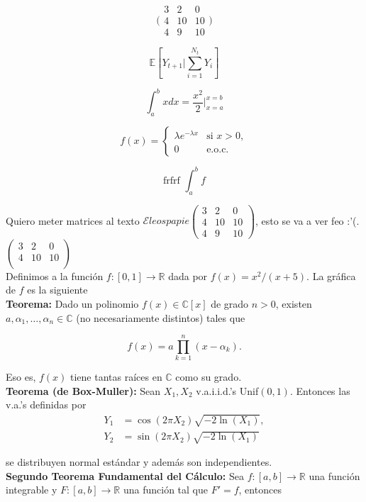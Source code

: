 \documentclass[a4paper,11pt, twocolumn]{article}
\newcommand{\RR}{\mathbb{R}}
\newcommand{\1}{\mathbbm{1}}
\begin{document}
\[\Bigg(\begin{matrix}
3 & 2 & 0\\
4 & 10 & 10\\
4 & 9 & 10
\end{matrix}\Bigg)
\]

\[\mathbb E \left[Y_{t+1} \Bigg| \sum_{i=1}^{N_t}Y_i\right] \]

\[\int_a^b x dx = \frac{x^2}{2}\bigg|_{x=a}^{x=b}\]

\[f(x) = \begin{cases}
 \lambda e^{-\lambda x} & \text{si }x>0,\\
 0 & \text{e.o.c.}
 \end{cases}
\]

\[\text{frfrf }\int_a^b f\]

Quiero meter matrices al texto $\mathcal{E}leospapie$$\begin{pmatrix}
3 & 2 & 0\\
4 & 10 & 10\\
4 & 9 & 10
\end{pmatrix}$, esto se va a ver feo :'(. $\left(\begin{smallmatrix}
3 & 2 & 0\\
4 & 10 & 10\\
\end{smallmatrix}\right)$\\ 


Definimos a la función $f:[0,1]\to \RR$ dada por $f(x) = x^2/(x+5)$. La gráfica de $f$ es la siguiente\\

\textbf{Teorema:} Dado un polinomio $f(x)\in \mathbb{C} [x]$ de grado $n>0$, existen $a,\alpha_1,\dots,\alpha_n\in\mathbb{C}$ (no necesariamente distintos) tales que

\[f(x) = a\prod_{k=1}^n (x-\alpha_k).\]

Eso es, $f(x)$ tiene tantas raíces en $\mathbb{C}$ como su grado.\\

\textbf{Teorema (de Box-Muller):} Sean $X_1,X_2$ v.a.i.i.d.'s Unif$(0,1)$. Entonces las v.a.'s definidas por 
\begin{align*}
Y_1 &= \cos(2\pi X_2)\sqrt{-2\ln(X_1)},\\
Y_2&=\sin(2\pi X_2)\sqrt{-2\ln(X_1)}
\end{align*}

se distribuyen normal estándar y además son independientes.\\

\textbf{Segundo Teorema Fundamental del Cálculo:} Sea $f:[a,b]\to \mathbb{R}$ una función integrable y $F:[a,b]\to \mathbb{R}$ una función tal que $F'=f$, entonces 
\end{document}
